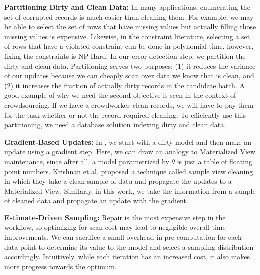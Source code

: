 \noindent\textbf{Partitioning Dirty and Clean Data: } In many applications, enumerating the set of corrupted records is much easier than cleaning them. For example, we may be able to select the set of rows that have missing values but actually filling those missing values is expensive. Likewise, in the constraint literature, selecting a set of rows that have a violated constraint can be done in polynomial time, however, fixing the constraints is NP-Hard.
In our error detection step, we partition the dirty and clean data.
Partitioning serves two purposes: (1) it reduces the variance of our updates because we can cheaply scan over data we know that is clean, and (2) it increases the fraction of actually dirty records in the candidate batch.
A good example of why we need the second objective is seen in the context of crowdsourcing.
If we have a crowdworker clean records, we will have to pay them for the task whether or not the record required cleaning.
To efficiently use this partitioning, we need a database solution indexing dirty and clean data.

\vspace{0.5em}

\noindent\textbf{Gradient-Based Updates: } In \sys, we start with a dirty model and then make an update using a gradient step. Here, we can draw an analogy to Materialized View maintenance, since after all, a model parametrized by $\theta$ is just a table of floating point numbers.
Krishnan et al. proposed a technique called sample view cleaning, in which they take a clean sample of data and propagate the updates to a Materialized View.
Similarly, in this work, we take the information from a sample of cleaned data and propagate an update with the gradient.

\vspace{0.5em}

\noindent\textbf{Estimate-Driven Sampling: } Repair is the most expensive step in the workflow, so optimizing for scan cost may lead to negligible overall time improvements.
We can sacrifice a small overhead in pre-computation for each data point to determine its value to the model and select a sampling distribution accordingly.
Intuitively, while each iteration has an increased cost, it also makes more progress towards the optimum.
\fi


